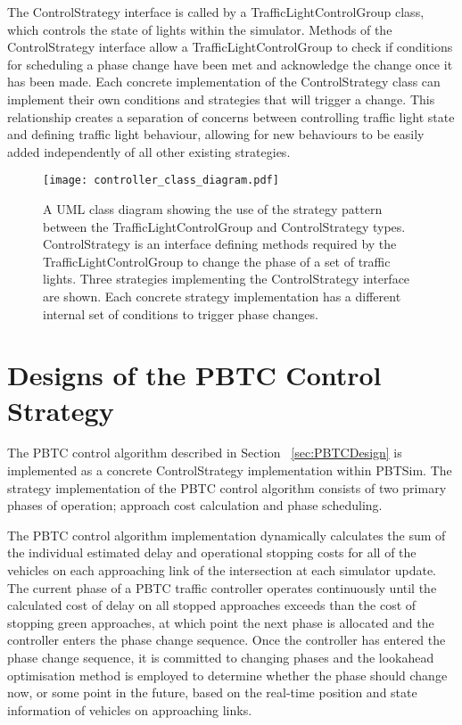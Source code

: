 The ControlStrategy interface is called by a TrafficLightControlGroup class, which controls the state of lights within the simulator. Methods of the ControlStrategy interface allow a TrafficLightControlGroup to check if conditions for scheduling a phase change have been met and acknowledge the change once it has been made. Each concrete implementation of the ControlStrategy class can implement their own conditions and strategies that will trigger a change. This relationship creates a separation of concerns between controlling traffic light state and defining traffic light behaviour, allowing for new behaviours to be easily added independently of all other existing strategies. 

\begin{figure}[]
\centering
	\texttt{[image: controller\_class\_diagram.pdf]}
	\caption{ A UML class diagram showing the use of the strategy pattern between the TrafficLightControlGroup and ControlStrategy types. ControlStrategy is an interface defining methods required by the TrafficLightControlGroup to change the phase of a set of traffic lights. Three strategies implementing the ControlStrategy interface are shown. Each concrete strategy implementation has a different internal set of conditions to trigger phase changes. }
\label{controllerclassdiagram}
\end{figure}


\section{Designs of the PBTC Control Strategy}

The PBTC control algorithm described in Section ~\ref{sec:PBTCDesign} is implemented as a concrete ControlStrategy implementation within PBTSim. The strategy implementation of the PBTC control algorithm consists of two primary phases of operation; approach cost calculation and phase scheduling. 

The PBTC control algorithm implementation dynamically calculates the sum of the individual estimated delay and operational stopping costs for all of the vehicles on each approaching link of the intersection at each simulator update. 
The current phase of a PBTC traffic controller operates continuously until the calculated cost of delay on all stopped approaches exceeds than the cost of stopping green approaches, at which point the next phase is allocated and the controller enters the phase change sequence. Once the controller has entered the phase change sequence, it is  committed to changing phases and the lookahead optimisation method is employed to determine whether the phase should change now, or some point in the future, based on the real-time position and state information of vehicles on approaching links. 

